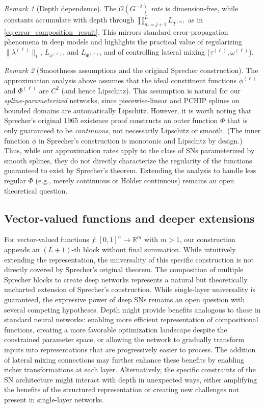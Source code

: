\documentclass{article}
\theoremstyle{plain}
\theoremstyle{definition}
\theoremstyle{remark}
\newtheorem{remark}{Remark}
\begin{document}
\begin{remark}[Depth dependence]
The $\mathcal{O}(G^{-2})$ \emph{rate} is dimension-free, while constants accumulate with depth through $\prod_{m=j+1}^{L}L_{T^{(m)}}$ as in \eqref{eq:error_composition_result}. This mirrors standard error-propagation phenomena in deep models and highlights the practical value of regularizing $\|\lambda^{(\ell)}\|_{1}$, $L_{\phi^{(\ell)}}$, and $L_{\Phi^{(\ell)}}$, and of controlling lateral mixing ($\tau^{(\ell)},\omega^{(\ell)}$).
\end{remark}

\begin{remark}[Smoothness assumptions and the original Sprecher construction]
The approximation analysis above assumes that the ideal constituent functions $\phi^{(\ell)}$ and $\Phi^{(\ell)}$ are $C^2$ (and hence Lipschitz). This assumption is natural for our \emph{spline-parameterized} networks, since piecewise-linear and PCHIP splines on bounded domains are automatically Lipschitz. However, it is worth noting that Sprecher's original 1965 existence proof constructs an outer function $\Phi$ that is only guaranteed to be \emph{continuous}, not necessarily Lipschitz or smooth. (The inner function $\phi$ in Sprecher's construction is monotonic and Lipschitz by design.) Thus, while our approximation rates apply to the class of SNs parameterized by smooth splines, they do not directly characterize the regularity of the functions guaranteed to exist by Sprecher's theorem. Extending the analysis to handle less regular $\Phi$ (e.g., merely continuous or H\"older continuous) remains an open theoretical question.
\end{remark}

\subsection{Vector-valued functions and deeper extensions}
For vector-valued functions $f: [0,1]^n \to \mathbb{R}^m$ with $m>1$, our construction appends an $(L+1)$-th block without final summation. While intuitively extending the representation, the universality of this specific construction is not directly covered by Sprecher's original theorem. The composition of multiple Sprecher blocks to create deep networks represents a natural but theoretically uncharted extension of Sprecher's construction. While single-layer universality is guaranteed, the expressive power of deep SNs remains an open question with several competing hypotheses. Depth might provide benefits analogous to those in standard neural networks: enabling more efficient representation of compositional functions, creating a more favorable optimization landscape despite the constrained parameter space, or allowing the network to gradually transform inputs into representations that are progressively easier to process. The addition of lateral mixing connections may further enhance these benefits by enabling richer transformations at each layer. Alternatively, the specific constraints of the SN architecture might interact with depth in unexpected ways, either amplifying the benefits of the structured representation or creating new challenges not present in single-layer networks.
\end{document}

